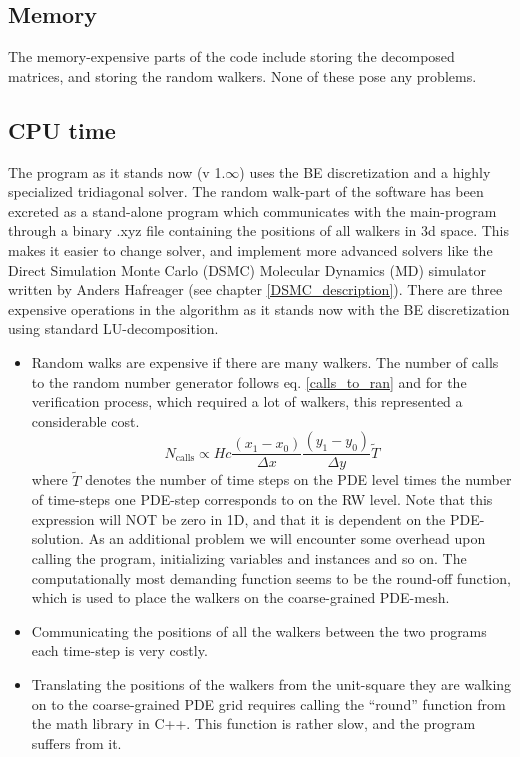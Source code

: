 \subsection{Memory}
The memory-expensive parts of the code include storing the decomposed matrices, and storing the random walkers. 
None of these pose any problems.

\subsection{CPU time}
The program as it stands now (v 1.$\infty$) uses the BE discretization and a highly specialized tridiagonal solver. 
The random walk-part of the software has been excreted as a stand-alone program which communicates with the main-program through a binary .xyz file containing the positions of all walkers in 3d space. This makes it easier to change solver, and implement more advanced solvers like the Direct Simulation Monte Carlo (DSMC) Molecular Dynamics (MD) simulator written by Anders Hafreager (see chapter \ref{DSMC_description}). 
There are three expensive operations in the algorithm as it stands now with the BE discretization using standard LU-decomposition.
\begin{itemize}
\item Random walks are expensive if there are many walkers. The number of calls to the random number generator follows eq. \eqref{calls_to_ran} and for the verification process, which required a lot of walkers, this represented a considerable cost. 
\begin{equation}\label{calls_to_ran}
 N_{\text{calls}} \propto Hc\frac{(x_1-x_0)}{\Delta x}\frac{(y_1-y_0)}{\Delta y}\tilde{T}
\end{equation}
where $\tilde{T}$ denotes the number of time steps on the PDE level times the number of time-steps one PDE-step corresponds to on the RW level. Note that this expression will NOT be zero in 1D, and that it is dependent on the PDE-solution.
As an additional problem we will encounter some overhead upon calling the program, initializing variables and instances and so on. 
The computationally most demanding function seems to be the round-off function, which is used to place the walkers on the coarse-grained PDE-mesh.
\item Communicating the positions of all the walkers between the two programs each time-step is very costly.
\item Translating the positions of the walkers from the unit-square they are walking on to the coarse-grained PDE grid requires calling the ``round'' function from the math library in C++. This function is rather slow, and the program suffers from it. 
\end{itemize}


